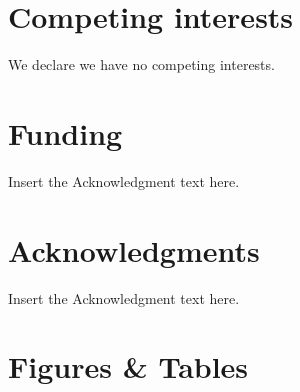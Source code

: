 \documentclass[]{rsos}%
\begin{document}
\section*{Competing interests}
We declare we have no competing interests.

\section*{Funding}
Insert the Acknowledgment text here.

\section*{Acknowledgments}
Insert the Acknowledgment text here.




\linespread{1}\selectfont %



\pagebreak



\section*{Figures \& Tables}


\linespread{1.3}\selectfont %
\end{document}
